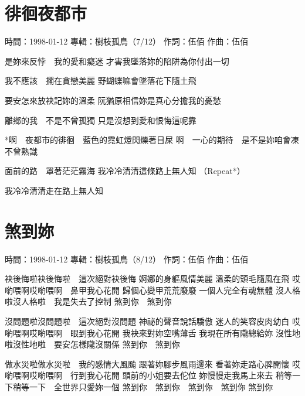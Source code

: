 \documentclass[UTF8,a4paper,oneside,twocolumn,12pt]{ctexbook}
\newcommand{\infopair}[2]{\textbullet #1：#2}
\newcommand{\zc}[1][伍佰]{\infopair{作詞}{#1}}
\newcommand{\zq}[1][伍佰]{\infopair{作曲}{#1}}
\newcommand{\zj}[1]{\infopair{專輯}{#1}}
\newcommand{\sj}[1]{\infopair{時間}{#1}}
\newenvironment{info}{\begin{flushleft}\kaishu
	}
	{\end{flushleft}\normalsize\yahei\par}
\newenvironment{lyric}{
	}
{}
\begin{document}
\section{徘徊夜都市}
\begin{info}
	\sj{1998-01-12}
	\zj{樹枝孤鳥（7/12）}
	\zc
	\zq
\end{info}
\begin{lyric}
	是妳來反悖　我的愛和癡迷
	才害我墜落妳的陷阱為你付出一切

	我不應該　擱在貪戀美麗
	野蝴蝶嘛會墜落花下隨土飛

	要安怎來放袂記妳的溫柔
	阮猶原相信妳是真心分擔我的憂愁

	離鄉的我　不是不曾孤獨
	只是沒想到愛和恨悔這呢靠

	*啊　夜都市的徘徊　藍色的霓虹燈閃爍著目屎
	啊　一心的期待　是不是妳咱會凍不曾熟識

	面前的路　罩著茫茫霧海
	我冷冷清清這條路上無人知
	（Repeat*）

	我冷冷清清走在路上無人知
\end{lyric}

\section{煞到妳}
\begin{info}
	\sj{1998-01-12}
	\zj{樹枝孤鳥（8/12）}
	\zc
	\zq
\end{info}
\begin{lyric}
	袂後悔啦袂後悔啦　這次絕對袂後悔
	婀娜的身軀風情美麗
	溫柔的頭毛隨風在飛
	哎喲喂啊哎喲喂啊　鼻甲我心花開
	歸個心變甲荒荒廢廢
	一個人完全有魂無體
	沒人格啦沒人格啦　我是失去了控制
	煞到你　煞到你

	沒問題啦沒問題啦　這次絕對沒問題
	神祕的聲音說話驕傲
	迷人的笑容皮肉幼白
	哎喲喂啊哎喲喂啊　眼到我心花開
	我袂來對妳空嘴薄舌
	我現在所有隴總給妳
	沒性地啦沒性地啦　要安怎樣隴沒關係
	煞到你　煞到你

	做水災啦做水災啦　我的感情大風颱
	跟著妳腳步風雨邊來
	看著妳走路心脾開懷
	哎喲喂啊哎喲喂啊　行到我心花開
	頭前的小姐要去佗位
	妳慢慢走我馬上來去
	稍等一下稍等一下　全世界只愛妳一個
	煞到你　煞到你　煞到你　煞到你
	煞到你
\end{lyric}
\end{document}
